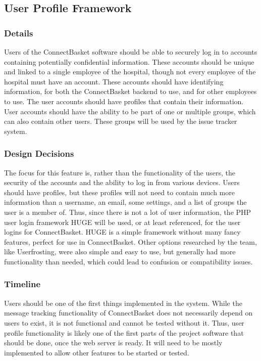 \documentclass[onecolumn, draftclsnofoot,10pt, compsoc]{IEEEtran}
\begin{document}
\subsection{User Profile Framework}


\subsubsection{Details}
Users of the ConnectBasket software should be able to securely log in to accounts containing potentially confidential information. These accounts should be unique and linked to a single employee of the hospital, though not every employee of the hospital must have an account. These accounts should have identifying information, for both the ConnectBasket backend to use, and for other employees to use. The user accounts should have profiles that contain their information. User accounts should have the ability to be part of one or multiple groups, which can also contain other users. These groups will be used by the issue tracker system.


\subsubsection{Design Decisions}
The focus for this feature is, rather than the functionality of the users, the security of the accounts and the ability to log in from various devices. Users should have profiles, but these profiles will not need to contain much more information than a username, an email, some settings, and a list of groups the user is a member of. Thus, since there is not a lot of user information, the PHP user login framework HUGE will be used, or at least referenced, for the user logins for ConnectBasket. HUGE is a simple framework without many fancy features, perfect for use in ConnectBasket. Other options researched by the team, like Userfrosting, were also simple and easy to use, but generally had more functionality than needed, which could lead to confusion or compatibility issues.

\subsubsection{Timeline}
Users should be one of the first things implemented in the system. While the message tracking functionality of ConnectBasket does not necessarily depend on users to exist, it is not functional and cannot be tested without it. Thus, user profile functionality is likely one of the first parts of the project software that should be done, once the web server is ready. It will need to be mostly implemented to allow other features to be started or tested.
\end{document}

